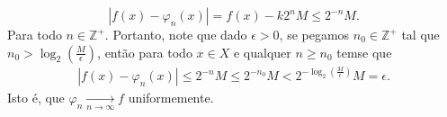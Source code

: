\begin{homeworkProblem}[2]
\begin{solution}
\begin{itemize}
        \begin{equation}
          \left| f(x)-\varphi_n(x) \right|=f(x)-k2^{n}M\leq 2^{-n}M.
        \end{equation}
        Para todo $n\in\mathbb{Z}^{+}$. Portanto, note que dado $\epsilon>0$, se pegamos $n_0\in\mathbb{Z}^{+}$ tal que $n_0> \log_{2}\left( \frac{M}{\epsilon} \right)$, então para todo $x\in X$ e qualquer $n\geq n_0$ temse que
        \begin{align*}
          \left| f(x)-\varphi_{n}(x) \right|\leq 2^{-n}M\leq 2^{-n_0}M< 2^{-\log_{2}\left( \frac{M}{\epsilon} \right)}M=\epsilon.
        \end{align*}
        Isto é, que $\varphi_n\xrightarrow[n\to\infty]{}f$ uniformemente. 
    \end{itemize} 
  \end{solution}
\end{homeworkProblem}
